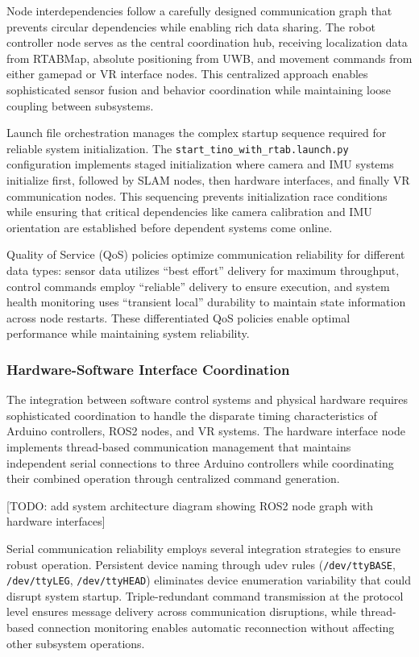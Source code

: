 Node interdependencies follow a carefully designed communication graph that prevents circular dependencies while enabling rich data sharing. The robot controller node serves as the central coordination hub, receiving localization data from RTABMap, absolute positioning from UWB, and movement commands from either gamepad or VR interface nodes. This centralized approach enables sophisticated sensor fusion and behavior coordination while maintaining loose coupling between subsystems.

Launch file orchestration manages the complex startup sequence required for reliable system initialization. The \texttt{start\_tino\_with\_rtab.launch.py} configuration implements staged initialization where camera and IMU systems initialize first, followed by SLAM nodes, then hardware interfaces, and finally VR communication nodes. This sequencing prevents initialization race conditions while ensuring that critical dependencies like camera calibration and IMU orientation are established before dependent systems come online.

Quality of Service (QoS) policies optimize communication reliability for different data types: sensor data utilizes ``best effort'' delivery for maximum throughput, control commands employ ``reliable'' delivery to ensure execution, and system health monitoring uses ``transient local'' durability to maintain state information across node restarts. These differentiated QoS policies enable optimal performance while maintaining system reliability.

\subsubsection{Hardware-Software Interface Coordination}

The integration between software control systems and physical hardware requires sophisticated coordination to handle the disparate timing characteristics of Arduino controllers, ROS2 nodes, and VR systems. The hardware interface node implements thread-based communication management that maintains independent serial connections to three Arduino controllers while coordinating their combined operation through centralized command generation.

[TODO: add system architecture diagram showing ROS2 node graph with hardware interfaces]

Serial communication reliability employs several integration strategies to ensure robust operation. Persistent device naming through udev rules (\texttt{/dev/ttyBASE}, \texttt{/dev/ttyLEG}, \texttt{/dev/ttyHEAD}) eliminates device enumeration variability that could disrupt system startup. Triple-redundant command transmission at the protocol level ensures message delivery across communication disruptions, while thread-based connection monitoring enables automatic reconnection without affecting other subsystem operations.

